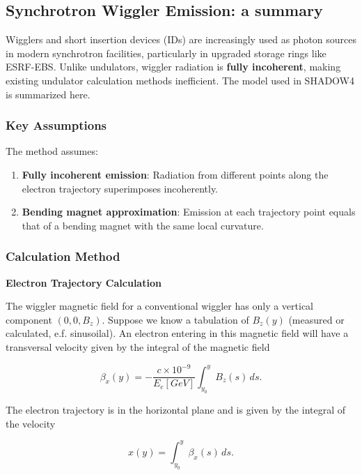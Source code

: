 \subsection{Synchrotron Wiggler Emission: a summary}

Wigglers and short insertion devices (IDs) are increasingly used as photon sources in modern synchrotron facilities, particularly in upgraded storage rings like ESRF-EBS. Unlike undulators, wiggler radiation is \textbf{fully incoherent}, making existing undulator calculation methods inefficient. The model used in SHADOW4 is summarized here.

\subsubsection{Key Assumptions}

The method assumes:
\begin{enumerate}
    \item \textbf{Fully incoherent emission}: Radiation from different points along the electron trajectory superimposes incoherently.
    \item \textbf{Bending magnet approximation}: Emission at each trajectory point equals that of a bending magnet with the same local curvature.
\end{enumerate}

\subsubsection{Calculation Method}

\textbf{Electron Trajectory Calculation}


The wiggler magnetic field for a
conventional wiggler has only a vertical component $(0, 0, B_z)$. Suppose we know a tabulation of $B_z(y)$ (measured or calculated, e.f. sinusoilal).  An
electron entering in this magnetic field will have a transversal velocity given by the integral of the magnetic field


\begin{equation}
\beta_x(y) = -\frac{c \times 10^{-9}}{E_e[GeV]} \int_{y_0}^{y} B_z(s) \, ds.
\end{equation}

The electron trajectory is in the horizontal plane and is given
by the integral of the velocity

\begin{equation}
x(y) = \int_{y_0}^{y} \beta_x(s) \, ds.
\end{equation}

